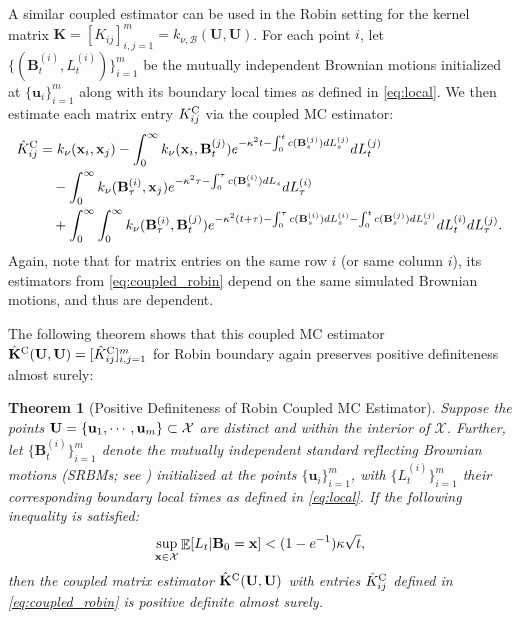 \documentclass[aos,preprint]{imsart}
\theoremstyle{plain}
\newtheorem{theorem}{Theorem}[section]
\DeclareMathOperator{\E}{\mathbb E}
\newcommand{\CalX}{\mathcal X}
\newcommand{\Bx}{\bold x}
\newcommand{\BFx}{\bold x}
\newcommand{\BU}{\bold U}
\newcommand{\Bu}{\bold u}
\newcommand{\cmtS}[1]{{\color{red}{(Simon: #1)}}}
\theoremstyle{remark}
\begin{document}
A similar coupled estimator can be used in the Robin setting for the kernel matrix $\mathbf{K} = [K_{ij}]_{i,j=1}^m = k_{\nu ,\mathcal{B}}(\mathbf{U},\mathbf{U})$. For each point $i$, let $\{(\mathbf{B}_{t}^{(i)}, L_{t}^{(i)})\}_{i=1}^m$ be the mutually independent Brownian motions initialized at $\{\mathbf{u}_i\}_{i=1}^m$ along with its boundary local times as defined in \eqref{eq:local}. We then estimate each matrix entry $K_{ij}^{\rm C}$ via the coupled MC estimator:
\begin{align}
\begin{split}
     \hat{K}_{ij}^{\rm C} &= k_{\nu}(\Bx_i,\Bx_j)-  \int_0^{\infty} k_{\nu}(\Bx_i,\bold{B}^{(j)}_{t})e^{-\kappa^2t-\int_0^tc(\bold{B}^{(j)}_{s})dL_s^{(j)}}dL_t^{(j)}  \\
        & \quad - \int_0^{\infty} k_{\nu}(\bold{B}^{(i)}_{\tau},\Bx_j)e^{-\kappa^2\tau-\int_0^\tau c(\bold{B}^{(i)}_{s})dL_s}dL^{(i)}_\tau  \\
        &\quad +  \int_0^{\infty}\int_0^{\infty} k_{\nu}(\bold{B}^{(i)}_{\tau},\bold{B}^{(j)}_{t})e^{-\kappa^2(t+\tau)-\int_0^\tau c(\bold{B}^{(i)}_{s})dL_s^{(i)}-\int_0^tc(\bold{B}^{(j)}_{s})dL_s^{(j)}}dL_t^{(i)}dL_\tau^{(j)}.
        \label{eq:coupled_robin}
\end{split}
\end{align}
Again, note that for matrix entries on the same row $i$ (or same column $i$), its estimators from \eqref{eq:coupled_robin} depend on the same simulated Brownian motions, and thus are dependent.

The following theorem shows that this coupled MC estimator $\hat{\mathbf{K}}^{\rm C}(\mathbf{U},\mathbf{U}) = [\hat{K}^{\rm C}_{ij}]_{i,j=1}^m$ for Robin boundary again preserves positive definiteness almost surely:
\begin{theorem}[Positive Definiteness of Robin Coupled MC Estimator]
\label{thm:empirical_BdryMat_Robin}
   Suppose the points \(\BU = \{\Bu_1, \cdots, \Bu_m\} \subset \mathcal{X}\) are distinct and within the interior of $\mathcal{X}$. Further, let $\{\mathbf{B}_{t}^{(i)}\}_{i=1}^m$ denote the mutually independent standard reflecting Brownian motions (SRBMs; see \cite{harrison1981reflected}) initialized at the points $\{\mathbf{u}_i\}_{i=1}^m$, with $\{L_{t}^{(i)}\}_{i=1}^m$ their corresponding boundary local times as defined in \eqref{eq:local}. If the following inequality is satisfied: 
   \begin{equation}
    \label{eq:empirical_BdryMat_Robin}
    \sup_{\BFx\in\CalX}\E[L_t|\bold{B}_0=\BFx] < (1-e^{-1})\kappa \sqrt{t},
\end{equation}
then the coupled matrix estimator $\hat{\mathbf{K}}^{\rm C}(\mathbf{U},\mathbf{U})$ with entries $\hat{K}_{ij}^{\rm C}$ defined in \eqref{eq:coupled_robin} is positive definite almost surely. 
\end{theorem}
\end{document}
